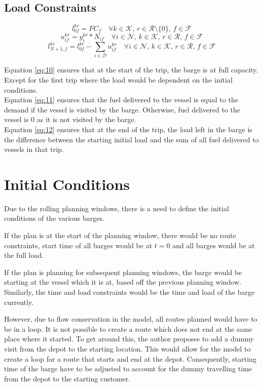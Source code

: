 \subsection{Load Constraints}

\begin{equation} \label{eq:10}
l_{0f}^{kr} = FC_{f} \quad \forall k \in \mathcal{K}, \, r \in \mathcal{R} \setminus \{0\}, \, f \in \mathcal{F}
\end{equation}
\begin{equation} \label{eq:11}
u_{if}^{kr} = y_{i}^{kr} * N_{if} \quad \forall i \in \mathcal{N},\, k \in \mathcal{K}, \, r \in \mathcal{R}, \, f \in \mathcal{F}
\end{equation}
\begin{equation} \label{eq:12}
l_{N+1,f}^{kr} = l_{0f}^{kr} - \sum_{i \in \mathcal{D}}u_{if}^{kr}   \quad \forall i \in \mathcal{N},\, k \in \mathcal{K}, \, r \in \mathcal{R}, \, f \in \mathcal{F}
\end{equation}

Equation \ref{eq:10} ensures that at the start of the trip, the barge is at full capacity. Except for the first trip where the load would be dependent on the initial conditions. \\

Equation \ref{eq:11} ensures that the fuel delivered to the vessel is equal to the demand if the vessel is visited by the barge. Otherwise, fuel delivered to the vessel is 0 as it is not visited by the barge.\\

Equation \ref{eq:12} ensures that at the end of the trip, the load left in the barge is the difference between the starting initial load and the sum of all fuel delivered to vessels in that trip.


\section{Initial Conditions}
Due to the rolling planning windows, there is a need to define the initial conditions of the various barges. \par
If the plan is at the start of the planning window, there would be no route constraints, start time of all barges would be at $t=0$ and all barges would be at the full load.\par
If the plan is planning for subsequent planning windows, the barge would be starting at the vessel which it is at, based off the previous planning window. Similarly, the time and load constraints would be the time and load of the barge currently.\par
However, due to flow conservation in the model, all routes planned would have to be in a loop. It is not possible to create a route which does not end at the same place where it started. To get around this, the author proposes to add a dummy visit from the depot to the starting location. This would allow for the model to create a loop for a route that starts and end at the depot. Consequently, starting time of the barge have to be adjusted to account for the dummy travelling time from the depot to the starting customer.
